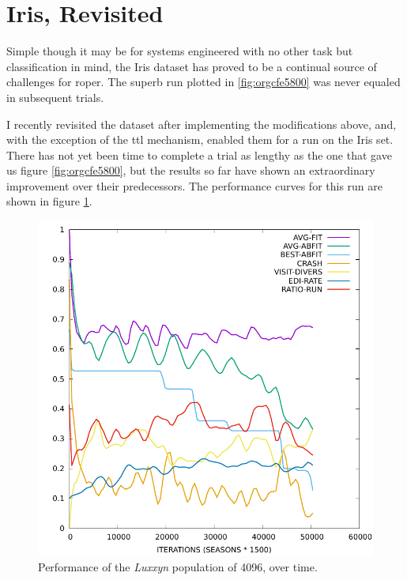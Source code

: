 \documentclass[12pt,glossary]{dalthesis}
\begin{document}
\section{Iris, Revisited}
\label{sec:orgc4005b1}
Simple though it may be for systems engineered with no other task but classification in mind, the Iris dataset has 
proved to be a continual source of challenges for \gls{roper}. The superb run plotted in
\ref{fig:orgcfe5800} was never equaled in subsequent trials. 

I recently revisited the dataset after implementing the modifications above, and, with
the exception of the \gls{ttl} mechanism, enabled them for a run on the Iris set. There
has not yet been time to complete a trial as lengthy as the one that gave us figure
\ref{fig:orgcfe5800}, but the results so far have shown an extraordinary improvement over
their predecessors. The performance curves for this run are shown in figure \ref{fig:orge6914b4}. 



\begin{figure}[htbp]
\centering
\includegraphics[width=.9\linewidth]{../images/plots/luxxyn.pdf}
\caption{\label{fig:orge6914b4}
Performance of the \emph{Luxxyn} population of 4096, over time.}
\end{figure}
\end{document}

